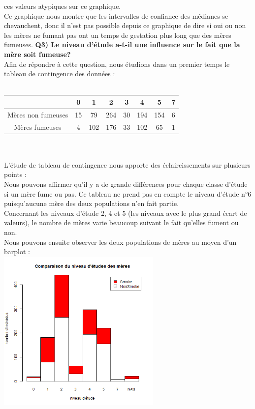 \documentclass[a4paper, 9pt]{article}
\begin{document}
ces valeurs atypiques sur ce graphique.\\
Ce graphique nous montre que les intervalles de confiance des m\'edianes se chevauchent, donc il n'est pas possible depuis ce graphique de
dire si oui ou non les m\`eres ne fumant pas ont un temps de gestation plus long que des m\`eres fumeuses.
\newpage
\textbf{Q3) Le niveau d’étude a-t-il une influence sur le fait que la mère soit fumeuse?}\\
Afin de r\'epondre \`a cette question, nous \'etudions dans un premier temps le tableau de contingence des donn\'ees :\\ \\
\begin{tabular}{|c|c|c|c|c|c|c|c|}
\hline
 & 0 & 1 & 2 & 3 & 4 & 5 & 7\\
\hline
M\`eres non fumeuses & 15 & 79 & 264 & 30 & 194 & 154 & 6 \\
\hline
M\`eres fumeuses & 4 & 102 & 176 & 33 & 102 & 65 & 1 \\
\hline
\end{tabular}\\
\\L'\'etude de tableau de contingence nous apporte des \'eclaircissements sur plusieurs points :\\
Nous pouvons affirmer qu'il y a de grande diff\'erences pour chaque classe d'\'etude si un m\`ere fume ou pas.
Ce tableau ne prend pas en compte le niveau d'\'etude n°6 puisqu'aucune m\`ere des deux populations n'en fait partie.\\
Concernant les niveaux d'\'etude 2, 4 et 5 (les niveaux avec le plus grand \'ecart de valeurs), le nombre de m\`eres varie beaucoup
suivant le fait qu'elles fument ou non.\\
Nous pouvons ensuite observer les deux populations de m\`eres au moyen d'un barplot :\\
\includegraphics[height = 8cm, width = 8cm]{plots/barplot_etude_smoke.png}\\
\end{document}
